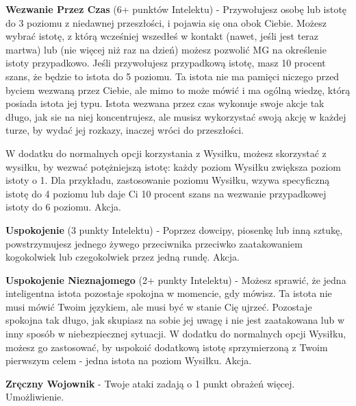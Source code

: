 \textbf{Wezwanie Przez Czas}\label{sec:Wezwanie Przez Czas} (6+ punktów Intelektu) - Przywołujesz osobę lub istotę do 3 poziomu z niedawnej przeszłości, i pojawia się ona obok Ciebie. Możesz wybrać istotę, z którą wcześniej wszedłeś w kontakt (nawet, jeśli jest teraz martwa) lub (nie więcej niż raz na dzień) możesz pozwolić MG na określenie istoty przypadkowo. Jeśli przywołujesz przypadkową istotę, masz 10 procent szans, że będzie to istota do 5 poziomu. Ta istota nie ma pamięci niczego przed byciem wezwaną przez Ciebie, ale mimo to może mówić i ma ogólną wiedzę, którą posiada istota jej typu. Istota wezwana przez czas wykonuje swoje akcje tak długo, jak sie na niej koncentrujesz, ale musisz wykorzystać swoją akcję w każdej turze, by wydać jej rozkazy, inaczej wróci do przeszłości.

W dodatku do normalnych opcji korzystania z Wysiłku, możesz skorzystać z wysiłku, by wezwać potężniejszą istotę: każdy poziom Wysiłku zwiększa poziom istoty o 1. Dla przykładu, zastosowanie poziomu Wysiłku, wzywa specyficzną istotę do 4 poziomu lub daje Ci 10 procent szans na wezwanie przypadkowej istoty do 6 poziomu. Akcja.

\textbf{Uspokojenie}\label{sec:Uspokojenie} (3 punkty Intelektu) - Poprzez dowcipy, piosenkę lub inną sztukę, powstrzymujesz jednego żywego przeciwnika przeciwko zaatakowaniem kogokolwiek lub czegokolwiek przez jedną rundę. Akcja.

\textbf{Uspokojenie Nieznajomego}\label{sec:Uspokojenie Nieznajomego} (2+ punkty Intelektu) - Możesz sprawić, że jedna inteligentna istota pozostaje spokojna w momencie, gdy mówisz. Ta istota nie musi mówić Twoim językiem, ale musi być w stanie Cię ujrzeć. Pozostaje spokojna tak długo, jak skupiasz na sobie jej uwagę i nie jest zaatakowana lub w inny sposób w niebezpiecznej sytuacji. W dodatku do normalnych opcji Wysiłku, możesz go zastosować, by uspokoić dodatkową istotę sprzymierzoną z Twoim pierwszym celem - jedna istota na poziom Wysiłku. Akcja.

\textbf{Zręczny Wojownik}\label{sec:Zręczny Wojownik} - Twoje ataki zadają o 1 punkt obrażeń więcej. Umożliwienie. 

